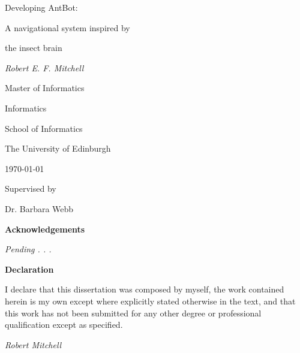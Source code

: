 \documentclass[a4paper,11pt,twoside,openright]{article}
\begin{document}
\centering
\vspace*{6cm}
        {\huge Developing AntBot: \par A navigational system inspired by \par the
          insect brain \par}
\vspace{1cm}
{\Large \textit{Robert E. F. Mitchell}}

\vspace{3cm}

{\large Master of Informatics \par}
{\large Informatics \par}
{\large School of Informatics \par}
{\large The University of Edinburgh \par}
\large \today \par

\vfill
Supervised by\par
Dr. Barbara Webb

\newpage
\thispagestyle{empty}
\mbox{}
\newpage

\centering
{\LARGE \textbf{Acknowledgements}}
\begin{flushleft}
 {\small \textit{Pending . . .} }
\end{flushleft}  

\newpage
\thispagestyle{empty}
\mbox{}
\newpage

\centering
{\LARGE\textbf{Declaration}}
\begin{flushleft}
  {\small
    I declare that this dissertation was composed by myself, the work
    contained herein is my own except where explicitly stated otherwise
    in the text, and that this work has not been submitted for any other
    degree or professional qualification except as specified.
    \par 

    \textit{Robert Mitchell}}

\end{flushleft}
\end{document}
